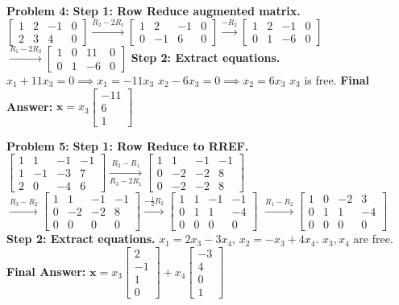 \documentclass[12pt]{article}
\begin{document}
\textbf{Problem 4:}
\textbf{Step 1: Row Reduce augmented matrix.}
$\begin{bmatrix} 1 & 2 & -1 & 0 \\ 2 & 3 & 4 & 0 \end{bmatrix} \xrightarrow{R_2 - 2R_1} \begin{bmatrix} 1 & 2 & -1 & 0 \\ 0 & -1 & 6 & 0 \end{bmatrix} \xrightarrow{-R_2} \begin{bmatrix} 1 & 2 & -1 & 0 \\ 0 & 1 & -6 & 0 \end{bmatrix}$
$\xrightarrow{R_1 - 2R_2} \begin{bmatrix} 1 & 0 & 11 & 0 \\ 0 & 1 & -6 & 0 \end{bmatrix}$
\textbf{Step 2: Extract equations.}
$x_1 + 11x_3 = 0 \implies x_1 = -11x_3$
$x_2 - 6x_3 = 0 \implies x_2 = 6x_3$
$x_3$ is free.
\textbf{Final Answer:} $\mathbf{x} = x_3 \begin{bmatrix} -11 \\ 6 \\ 1 \end{bmatrix}$

\textbf{Problem 5:}
\textbf{Step 1: Row Reduce to RREF.}
$\begin{bmatrix} 1 & 1 & -1 & -1 \\ 1 & -1 & -3 & 7 \\ 2 & 0 & -4 & 6 \end{bmatrix} \xrightarrow[R_3 - 2R_1]{R_2 - R_1} \begin{bmatrix} 1 & 1 & -1 & -1 \\ 0 & -2 & -2 & 8 \\ 0 & -2 & -2 & 8 \end{bmatrix}$
$\xrightarrow{R_3 - R_2} \begin{bmatrix} 1 & 1 & -1 & -1 \\ 0 & -2 & -2 & 8 \\ 0 & 0 & 0 & 0 \end{bmatrix} \xrightarrow{-\frac{1}{2}R_2} \begin{bmatrix} 1 & 1 & -1 & -1 \\ 0 & 1 & 1 & -4 \\ 0 & 0 & 0 & 0 \end{bmatrix}$
$\xrightarrow{R_1 - R_2} \begin{bmatrix} 1 & 0 & -2 & 3 \\ 0 & 1 & 1 & -4 \\ 0 & 0 & 0 & 0 \end{bmatrix}$
\textbf{Step 2: Extract equations.}
$x_1 = 2x_3 - 3x_4$, $x_2 = -x_3 + 4x_4$. $x_3, x_4$ are free.
\textbf{Final Answer:} $\mathbf{x} = x_3 \begin{bmatrix} 2 \\ -1 \\ 1 \\ 0 \end{bmatrix} + x_4 \begin{bmatrix} -3 \\ 4 \\ 0 \\ 1 \end{bmatrix}$
\end{document}
